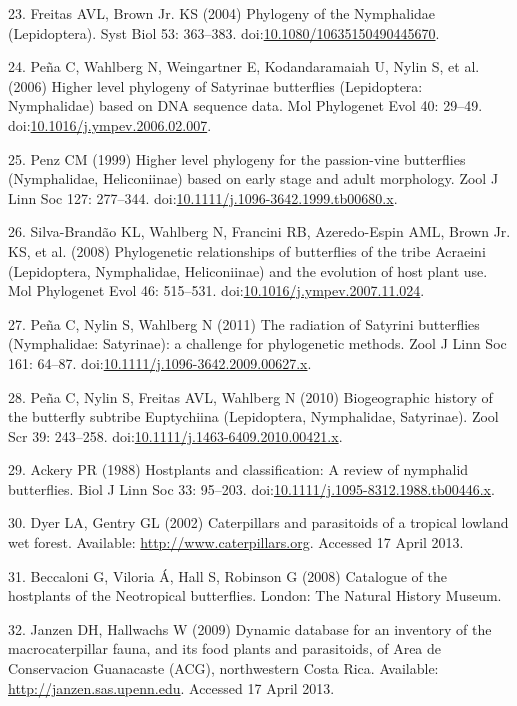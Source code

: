 \documentclass[]{article}
\begin{document}
23. Freitas AVL, Brown Jr. KS (2004) Phylogeny of the Nymphalidae
(Lepidoptera). Syst Biol 53: 363--383.
doi:\href{http://dx.doi.org/10.1080/10635150490445670}{10.1080/10635150490445670}.

24. Peña C, Wahlberg N, Weingartner E, Kodandaramaiah U, Nylin S, et al.
(2006) Higher level phylogeny of Satyrinae butterflies (Lepidoptera:
Nymphalidae) based on DNA sequence data. Mol Phylogenet Evol 40: 29--49.
doi:\href{http://dx.doi.org/10.1016/j.ympev.2006.02.007}{10.1016/j.ympev.2006.02.007}.

25. Penz CM (1999) Higher level phylogeny for the passion-vine
butterflies (Nymphalidae, Heliconiinae) based on early stage and adult
morphology. Zool J Linn Soc 127: 277--344.
doi:\href{http://dx.doi.org/10.1111/j.1096-3642.1999.tb00680.x}{10.1111/j.1096-3642.1999.tb00680.x}.

26. Silva-Brandão KL, Wahlberg N, Francini RB, Azeredo-Espin AML, Brown
Jr. KS, et al. (2008) Phylogenetic relationships of butterflies of the
tribe Acraeini (Lepidoptera, Nymphalidae, Heliconiinae) and the
evolution of host plant use. Mol Phylogenet Evol 46: 515--531.
doi:\href{http://dx.doi.org/10.1016/j.ympev.2007.11.024}{10.1016/j.ympev.2007.11.024}.

27. Peña C, Nylin S, Wahlberg N (2011) The radiation of Satyrini
butterflies (Nymphalidae: Satyrinae): a challenge for phylogenetic
methods. Zool J Linn Soc 161: 64--87.
doi:\href{http://dx.doi.org/10.1111/j.1096-3642.2009.00627.x}{10.1111/j.1096-3642.2009.00627.x}.

28. Peña C, Nylin S, Freitas AVL, Wahlberg N (2010) Biogeographic
history of the butterfly subtribe Euptychiina (Lepidoptera, Nymphalidae,
Satyrinae). Zool Scr 39: 243--258.
doi:\href{http://dx.doi.org/10.1111/j.1463-6409.2010.00421.x}{10.1111/j.1463-6409.2010.00421.x}.

29. Ackery PR (1988) Hostplants and classification: A review of
nymphalid butterflies. Biol J Linn Soc 33: 95--203.
doi:\href{http://dx.doi.org/10.1111/j.1095-8312.1988.tb00446.x}{10.1111/j.1095-8312.1988.tb00446.x}.

30. Dyer LA, Gentry GL (2002) Caterpillars and parasitoids of a tropical
lowland wet forest. Available: \url{http://www.caterpillars.org}.
Accessed 17 April 2013.

31. Beccaloni G, Viloria Á, Hall S, Robinson G (2008) Catalogue of the
hostplants of the Neotropical butterflies. London: The Natural History
Museum.

32. Janzen DH, Hallwachs W (2009) Dynamic database for an inventory of
the macrocaterpillar fauna, and its food plants and parasitoids, of Area
de Conservacion Guanacaste (ACG), northwestern Costa Rica. Available:
\url{http://janzen.sas.upenn.edu}. Accessed 17 April 2013.
\end{document}
